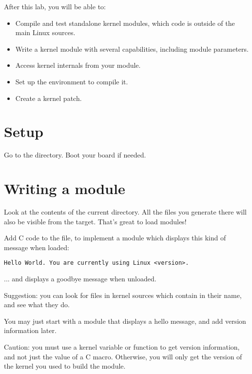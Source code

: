 
After this lab, you will be able to:

\begin{itemize}
\item Compile and test standalone kernel modules, which code is outside of the main Linux sources.
\item Write a kernel module with several capabilities, including module parameters.
\item Access kernel internals from your module.
\item Set up the environment to compile it.
\item Create a kernel patch.
\end{itemize}

\section{Setup}

Go to the  directory.
Boot your board if needed.

\section{Writing a module}

Look at the contents of the current directory. All the files you generate
there will also be visible from the target. That's great to load
modules!

Add C code to the  file, to implement a module which
displays this kind of message when loaded:

\begin{verbatim}
Hello World. You are currently using Linux <version>.
\end{verbatim}

... and displays a goodbye message when unloaded.

Suggestion: you can look for files in kernel sources which
contain  in their name, and see what they do.

You may just start with a module that displays a hello message, and
add version information later.

Caution: you must use a kernel variable or function to get version
information, and not just the value of a C macro. Otherwise, you will
only get the version of the kernel you used to build the
module.

